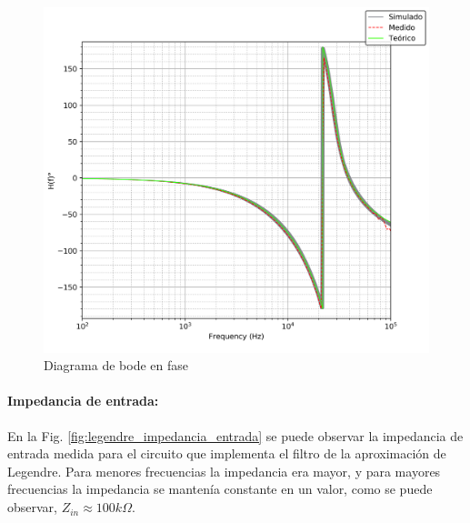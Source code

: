 \begin{figure}[H]
    \centering
    \includegraphics[scale=0.7]{../EJ1/Recursos/legendre_bode_fase.png}
    \caption{Diagrama de bode en fase}
    \label{fig:legendre_bode_fase}
\end{figure}

\paragraph{Impedancia de entrada:} En la Fig. \ref{fig:legendre_impedancia_entrada} se puede observar la impedancia de entrada medida para el circuito que implementa
el filtro de la aproximaci\'on de Legendre. Para menores frecuencias la impedancia era mayor, y para mayores frecuencias la impedancia se manten\'ia constante en un valor,
como se puede observar, $Z_{in} \approx 100k\Omega$.

